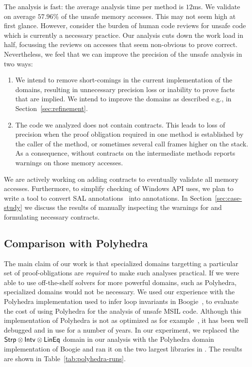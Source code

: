 \documentclass[10pt]{sigplanconf}
\begin{document}
The analysis is fast: the average analysis time per method is $12$ms.
We validate on average $57.96\%$ of the
unsafe memory accesses. This may not seem high at first glance. However,
consider the burden of human code reviews for unsafe code which is
currently a necessary practice. Our analysis cuts down the work load
in half, focussing the reviews on accesses that seem non-obvious to
prove correct. Nevertheless, we feel that we can improve the precision
of the unsafe analysis in two ways: 
\begin{enumerate}
\item We intend to remove short-comings in the current
implementation of the domains, resulting in unnecessary precision loss
or inability to prove facts that are implied. We intend to improve the
domains as described e.g., in Section~\ref{sec:refinement}.

\item The code we analyzed does not contain contracts. This leads to
  loss of precision when the proof obligation required in one method
  is established by the caller of the method, or sometimes several
  call frames higher on the stack.
As a consequence, without
contracts on the intermediate methods \Clousot{} reports warnings on
those memory accesses.  
\end{enumerate}
We are actively working on adding contracts to
eventually validate all memory accesses.  Furthermore, to simplify 
checking of Windows API uses, we plan to write a tool to convert
SAL annotations~\cite{DasEtAl06} into \Foxtrot{} annotations.  In
Section~\ref{sec:case-study} we discuss the results of manually
inspecting the warnings for  and formulating
necessary contracts.
 
\subsection{Comparison with Polyhedra}
The main claim of our work is that specialized domains targetting a
particular set of proof-obligations are \emph{required} to make
such analyses practical. If we were able to use off-the-shelf solvers
for more powerful domains, such as Polyhedra, specialized domains
would not be necessary. We used our experience with the Polyhedra
implementation used to infer loop invariants in Boogie~\cite{Boogie}, 
to evaluate the cost of using Polyhedra for the analysis of unsafe
MSIL code. Although this implementation of Polyhedra is not as
optimized as for example~\cite{PPL}, it has been well debugged and in use
for a number of years. In our experiment, we replaced the
$\mathsf{Strp}\otimes\mathsf{Intv}\otimes \mathsf{LinEq}$ domain in our analysis with
the Polyhedra domain implementation of Boogie and ran it on the two
largest libraries in \Net. The results are shown in
Table~\ref{tab:polyhedra-runs}.
\end{document}
